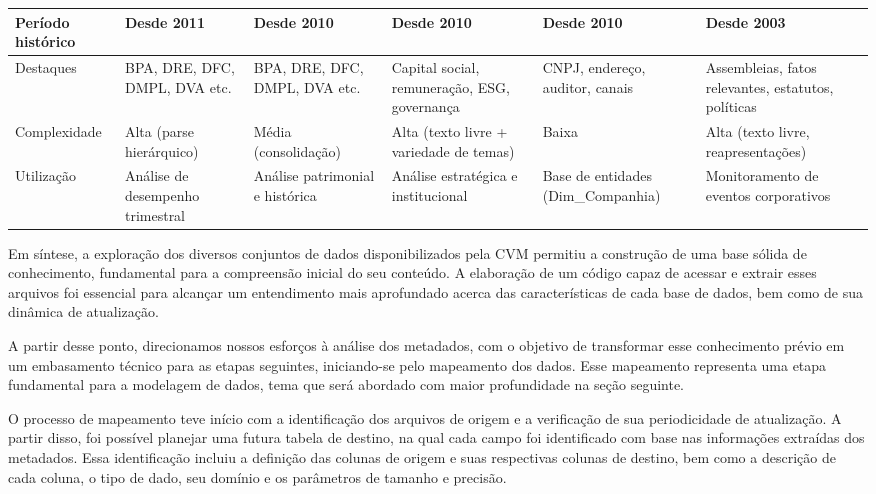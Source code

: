 \documentclass[recuosum=1.5cm]{iftex2024}
\begin{document}
\begin{board}[!htb]
\begin{varwidth}{\linewidth}
\begin{tabularx}{\textwidth}{|X|X|X|X|X|X|}
			Período histórico  & Desde 2011                        & Desde 2010                         & Desde 2010                                      & Desde 2010                         & Desde 2003                                           \\ \hline
			
			Destaques            & BPA, DRE, DFC, DMPL, DVA etc.     & BPA, DRE, DFC, DMPL, DVA etc.      & Capital social, remuneração, ESG, governança & CNPJ, endereço, auditor, canais   & Assembleias, fatos relevantes, estatutos, políticas \\ \hline
			
			Complexidade         & Alta (parse hierárquico)         & Média (consolidação)            & Alta (texto livre + variedade de temas)         & Baixa                              & Alta (texto livre, reapresentações)                \\ \hline
			
			Utilização         & Análise de desempenho trimestral & Análise patrimonial e histórica  & Análise estratégica e institucional           & Base de entidades (Dim\_Companhia) & Monitoramento de eventos corporativos                \\ \hline
		\end{tabularx}
	\end{varwidth}
\end{board}
	

Em síntese, a exploração dos diversos conjuntos de dados disponibilizados pela CVM permitiu a construção de uma base sólida de conhecimento, fundamental para a compreensão inicial do seu conteúdo. A elaboração de um código capaz de acessar e extrair esses arquivos foi essencial para alcançar um entendimento mais aprofundado acerca das características de cada base de dados, bem como de sua dinâmica de atualização.

A partir desse ponto, direcionamos nossos esforços à análise dos metadados, com o objetivo de transformar esse conhecimento prévio em um embasamento técnico para as etapas seguintes, iniciando-se pelo mapeamento dos dados. Esse mapeamento representa uma etapa fundamental para a modelagem de dados, tema que será abordado com maior profundidade na seção seguinte.

O processo de mapeamento teve início com a identificação dos arquivos de origem e a verificação de sua periodicidade de atualização. A partir disso, foi possível planejar uma futura tabela de destino, na qual cada campo foi identificado com base nas informações extraídas dos metadados. Essa identificação incluiu a definição das colunas de origem e suas respectivas colunas de destino, bem como a descrição de cada coluna, o tipo de dado, seu domínio e os parâmetros de tamanho e precisão.
\end{document}
